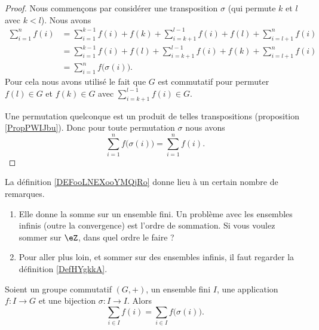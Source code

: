 \begin{proof}
    Nous commençons par considérer une transposition \( \sigma\) (qui permute \( k\) et \( l\) avec \( k<l\)). Nous avons
    \begin{subequations}
        \begin{align}
            \sum_{i=1}^nf(i)&=\sum_{i=1}^{k-1}f(i)+f(k)+\sum_{i=k+1}^{l-1}f(i)+f(l)+\sum_{i=l+1}^nf(i)\\
            &=\sum_{i=1}^{k-1}f(i)+f(l)+\sum_{i=k+1}^{l-1}f(i)+f(k)+\sum_{i=l+1}^nf(i)\\
            &=\sum_{i=1}^nf\big( \sigma(i) \big).
        \end{align}
    \end{subequations}
    Pour cela nous avons utilisé le fait que \( G\) est commutatif pour permuter \( f(l)\in G\) et \( f(k)\in G\) avec \( \sum_{i=k+1}^{l-1}f(i)\in G\).

    Une permutation quelconque est un produit de telles transpositions (proposition \ref{PropPWIJbu}). Donc pour toute permutation \( \sigma\) nous avons
    \begin{equation}
        \sum_{i=1}^nf\big( \sigma(i) \big)=\sum_{i=1}^nf(i).
    \end{equation}
\end{proof}

La définition \ref{DEFooLNEXooYMQjRo} donne lieu à un certain nombre de remarques.
\begin{enumerate}
    \item
        Elle donne la somme sur un ensemble fini. Un problème avec les ensembles infinis (outre la convergence) est l'ordre de sommation. Si vous voulez sommer sur \( \eZ\), dans quel ordre le faire ?
    \item
        Pour aller plus loin, et sommer sur des ensembles infinis, il faut regarder la définition \ref{DefHYgkkA}. 
\end{enumerate}

\begin{proposition}     \label{PROPooJBQVooNqWErk}
    Soient un groupe commutatif \( (G,+)\), un ensemble fini \( I\), une application \( f\colon I\to G\) et une bijection \( \sigma\colon I\to I\). Alors
    \begin{equation}
        \sum_{i\in I}f(i)=\sum_{i\in I}f\big( \sigma(i) \big).
    \end{equation}
\end{proposition}


